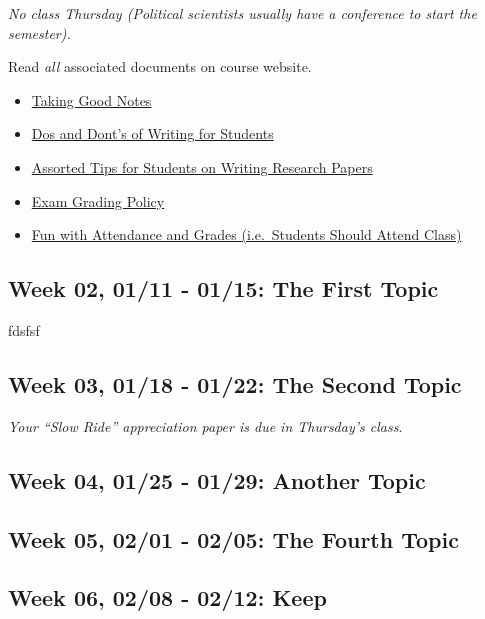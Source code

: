 \documentclass[11pt,]{article}
\providecommand{\tightlist}{%
  \setlength{\itemsep}{0pt}\setlength{\parskip}{0pt}}
\begin{document}
\emph{No class Thursday (Political scientists usually have a conference
to start the semester).}

Read \emph{all} associated documents on course website.

\begin{itemize}
\tightlist
\item
  \href{http://svmiller.com/blog/2014/09/taking-good-notes/}{Taking Good
  Notes}
\item
  \href{http://svmiller.com/blog/2015/06/dos-and-donts-of-writing-for-students/}{Dos
  and Dont's of Writing for Students}
\item
  \href{http://svmiller.com/blog/2015/12/assorted-tips-students-research-papers/}{Assorted
  Tips for Students on Writing Research Papers}
\item
  \href{https://www.dropbox.com/s/apihjs7di81aqcv/svm-exam-grading-policy.pdf?dl=0}{Exam
  Grading Policy}
\item
  \href{http://svmiller.com/blog/2016/05/fun-with-attendance-grades/}{Fun
  with Attendance and Grades (i.e.~Students Should Attend Class)}
\end{itemize}

\subsection{Week 02, 01/11 - 01/15: The First
Topic}\label{week-02-0111---0115-the-first-topic}

fdsfsf

\subsection{Week 03, 01/18 - 01/22: The Second
Topic}\label{week-03-0118---0122-the-second-topic}

\emph{Your ``Slow Ride'' appreciation paper is due in Thursday's class}.

\subsection{Week 04, 01/25 - 01/29: Another
Topic}\label{week-04-0125---0129-another-topic}

\subsection{Week 05, 02/01 - 02/05: The Fourth
Topic}\label{week-05-0201---0205-the-fourth-topic}

\subsection{Week 06, 02/08 - 02/12:
Keep}\label{week-06-0208---0212-keep}
\end{document}
